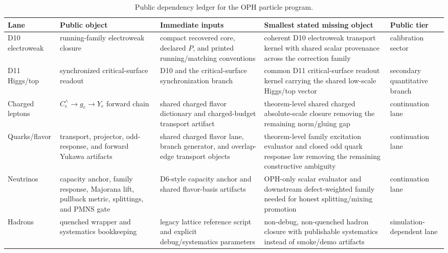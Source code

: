 \documentclass[11pt]{article}
\begin{document}
\begingroup
\footnotesize
\setlength{\tabcolsep}{3pt}
\begin{longtable}{@{}>{\raggedright\arraybackslash}p{}>{\raggedright\arraybackslash}p{}>{\raggedright\arraybackslash}p{}>{\raggedright\arraybackslash}p{}>{\raggedright\arraybackslash}p{}@{}}
\caption{Public dependency ledger for the OPH particle program.}\\
\toprule
Lane & Public object & Immediate inputs & Smallest stated missing object & Public tier \\
\midrule
\endhead
\bottomrule
\endfoot
D10 electroweak & running-family electroweak closure & compact recovered core, declared \(P\), and printed running/matching conventions & coherent D10 electroweak transport kernel with shared scalar provenance across the correction family & calibration sector \\
D11 Higgs/top & synchronized critical-surface readout & D10 and the critical-surface synchronization branch & common D11 critical-surface readout kernel carrying the shared low-scale Higgs/top vector & secondary quantitative branch \\
Charged leptons & \(C_e^{\wedge} \to g_e \to Y_e\) forward chain & shared charged flavor dictionary and charged-budget transport artifact & theorem-level shared charged absolute-scale closure removing the remaining norm/gluing gap & continuation lane \\
Quarks/flavor & transport, projector, odd-response, and forward Yukawa artifacts & shared charged flavor lane, branch generator, and overlap-edge transport objects & theorem-level family excitation evaluator and closed odd quark response law removing the remaining constructive ambiguity & continuation lane \\
Neutrinos & capacity anchor, family response, Majorana lift, pullback metric, splittings, and PMNS gate & D6-style capacity anchor and shared flavor-basis artifacts & OPH-only scalar evaluator and downstream defect-weighted family needed for honest splitting/mixing promotion & continuation lane \\
Hadrons & quenched wrapper and systematics bookkeeping & legacy lattice reference script and explicit debug/systematics parameters & non-debug, non-quenched hadron closure with publishable systematics instead of smoke/demo artifacts & simulation-dependent lane \\
\end{longtable}
\endgroup
\end{document}
